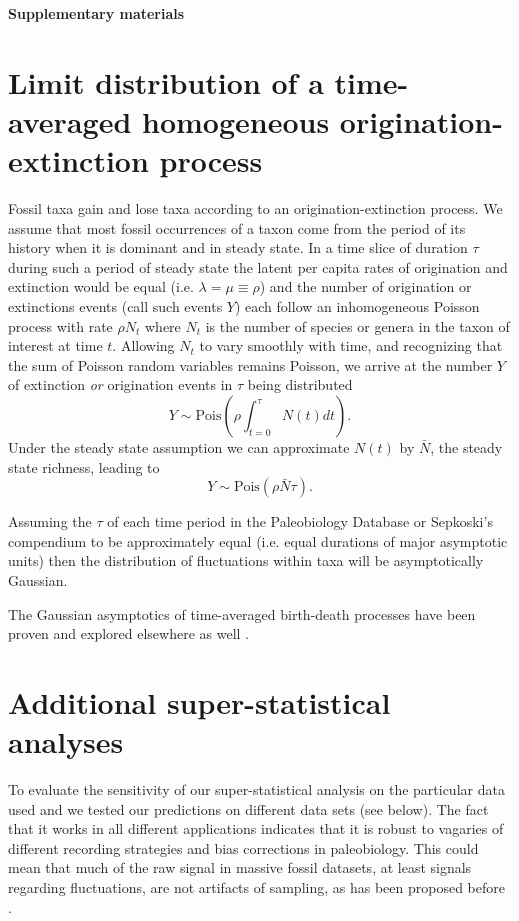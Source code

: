 \documentclass[12pt]{article}
\let\citep=\cite
\begin{document}
\beginsupplement

\begin{center}
{\LARGE \bf Supplementary materials}
\end{center}
\vspace{2em}

\section{Limit distribution of a time-averaged homogeneous
  origination-extinction process}
\label{sec:suppLimitDist}
Fossil taxa gain and lose taxa according to an origination-extinction
process. We assume that most fossil occurrences of a taxon come from
the period of its history when it is dominant and in steady state. In
a time slice of duration $\tau$ during such a period of steady state
the latent per capita rates of origination and extinction would be
equal (i.e. $\lambda = \mu \equiv \rho$) and the number of origination
or extinctions events (call such events $Y$) each follow an
inhomogeneous Poisson process with rate $\rho N_t$ where $N_t$ is the
number of species or genera in the taxon of interest at time
$t$. Allowing $N_t$ to vary smoothly with time, and recognizing that
the sum of Poisson random variables remains Poisson, we arrive at the
number $Y$ of extinction \emph{or} origination events in $\tau$ being
distributed
\begin{equation}
  \label{eq:eventPois1}
  Y \sim \text{Pois}(\rho \int_{t=0}^\tau N(t) dt).
\end{equation}
Under the steady state assumption we can approximate $N(t)$ by
$\bar{N}$, the steady state richness, leading to
\begin{equation}
  \label{eq:eventPois2}
  Y \sim \text{Pois}(\rho \bar{N} \tau).
\end{equation}

Assuming the $\tau$ of each time period in the Paleobiology Database
or Sepkoski's compendium to be approximately equal (i.e. equal
durations of major asymptotic units) then the distribution of
fluctuations within taxa will be asymptotically Gaussian.

The Gaussian asymptotics of time-averaged birth-death processes have
been proven and explored elsewhere as well \citep{keilson1970,
  grassmann1987}.

\section{Additional super-statistical analyses}
To evaluate the sensitivity of our super-statistical analysis on the
particular data used and we tested our predictions on different data
sets (see below). The fact that it works in all different applications
indicates that it is robust to vagaries of different recording
strategies and bias corrections in paleobiology. This could mean that
much of the raw signal in massive fossil datasets, at least signals
regarding fluctuations, are not artifacts of sampling, as has been
proposed before \citep{hannisdal2011}.
\end{document}
